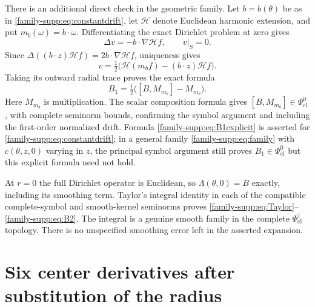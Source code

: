 \documentclass[11pt]{article}
\theoremstyle{definition}
\theoremstyle{remark}
\numberwithin{equation}{section}
\providecommand{\Ps}{\Psi_{\mathrm{cl}}}
\providecommand{\tht}{\theta}
\begin{document}
There is an additional direct check in the geometric family. Let
$b=b(\tht)$ be as in \eqref{family-supp:eq:constantdrift}, let $\mathcal H$ denote
Euclidean harmonic extension, and put $m_b(\omega)=b\cdot\omega$.
Differentiating the exact Dirichlet problem at zero gives
\[
 \Delta v=-b\cdot\nabla\mathcal H f,\qquad v|_S=0.
\]
Since $\Delta((b\cdot z)\mathcal H f)=2b\cdot\nabla\mathcal H f$,
uniqueness gives
\[
 v=\tfrac12\bigl(\mathcal H(m_bf)-(b\cdot z)\mathcal H f\bigr).
\]
Taking its outward radial trace proves the exact formula
\begin{equation}\label{family-supp:eq:B1explicit}
 B_1=\tfrac12\bigl([B,M_{m_b}]-M_{m_b}\bigr).
\end{equation}
Here $M_{m_b}$ is multiplication. The scalar composition formula gives
$[B,M_{m_b}]\in\Ps^0$, with complete seminorm bounds, confirming the
symbol argument and including the first-order normalized drift. Formula
\eqref{family-supp:eq:B1explicit} is asserted for \eqref{family-supp:eq:constantdrift}; in a general
family \eqref{family-supp:eq:family} with $c(\tht,z,0)$ varying in $z$, the principal
symbol argument still proves $B_1\in\Ps^0$ but this explicit formula
need not hold.

At $r=0$ the full Dirichlet operator is Euclidean, so $\Lambda(\tht,0)=B$
exactly, including its smoothing term. Taylor's integral identity in each
of the compatible complete-symbol and smooth-kernel seminorms proves
\eqref{family-supp:eq:Taylor}--\eqref{family-supp:eq:B2}. The integral is a genuine smooth family
in the complete $\Ps^1$ topology. There is no unspecified smoothing
error left in the asserted expansion.

\section{Six center derivatives after substitution of the radius}
\label{family-supp:sec:chain}
\end{document}
